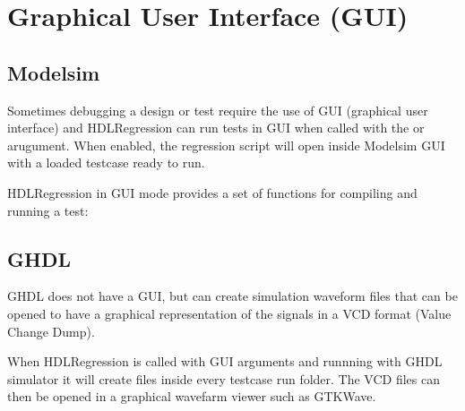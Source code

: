 \documentclass[letterpaper,10pt,english]{sphinxmanual}
\let\sphinxpxdimen\pdfpxdimen\else\newdimen\sphinxpxdimen
\begin{document}
\chapter{Graphical User Interface (GUI)}
\label{\detokenize{gui:graphical-user-interface-gui}}\label{\detokenize{gui::doc}}

\section{Modelsim}
\label{\detokenize{gui:modelsim}}
\sphinxAtStartPar
Sometimes debugging a design or test require the use of GUI (graphical user interface)
and HDLRegression can run tests in GUI when called with the  or  arugument.
When enabled, the regression script will open inside Modelsim GUI with a loaded testcase ready to run.

\begin{sphinxVerbatim}[commandchars=\\\{\}]
\end{sphinxVerbatim}

\sphinxAtStartPar
HDLRegression in GUI mode provides a set of functions for compiling and running a
test:

\noindent{\hspace*{\fill}\sphinxincludegraphics[width=550\sphinxpxdimen]{{gui_menu}.png}\hspace*{\fill}}


\section{GHDL}
\label{\detokenize{gui:ghdl}}
\sphinxAtStartPar
GHDL does not have a GUI, but can create simulation waveform files that can be opened to have a graphical representation
of the signals in a VCD format (Value Change Dump).

\sphinxAtStartPar
When HDLRegression is called with GUI arguments and runnning with GHDL simulator it will create  files
inside every testcase run folder. The VCD files can then be opened in a graphical wavefarm viewer such as GTKWave.

\begin{sphinxVerbatim}[commandchars=\\\{\}]
\end{sphinxVerbatim}
\end{document}
